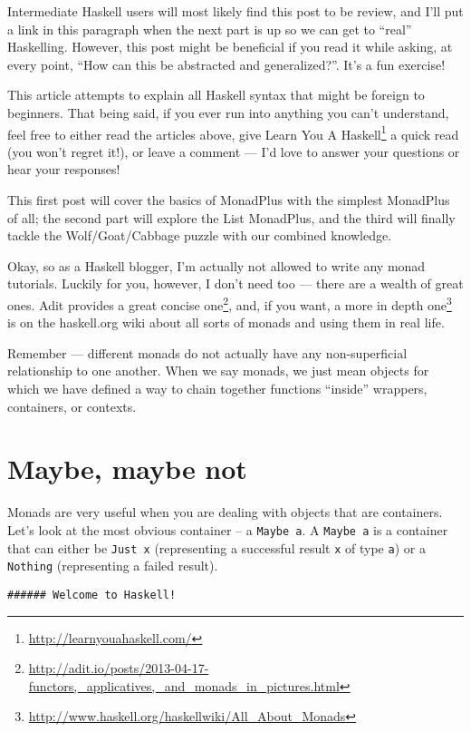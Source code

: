 \documentclass[]{article}
\renewcommand{\href}[2]{#2\footnote{\url{#1}}}
\begin{document}
Intermediate Haskell users will most likely find this post to be review,
and I'll put a link in this paragraph when the next part is up so we can
get to ``real'' Haskelling. However, this post might be beneficial if
you read it while asking, at every point, ``How can this be abstracted
and generalized?''. It's a fun exercise!

This article attempts to explain all Haskell syntax that might be
foreign to beginners. That being said, if you ever run into anything you
can't understand, feel free to either read the articles above, give
\href{http://learnyouahaskell.com/}{Learn You A Haskell} a quick read
(you won't regret it!), or leave a comment --- I'd love to answer your
questions or hear your responses!

This first post will cover the basics of MonadPlus with the simplest
MonadPlus of all; the second part will explore the List MonadPlus, and
the third will finally tackle the Wolf/Goat/Cabbage puzzle with our
combined knowledge.

Okay, so as a Haskell blogger, I'm actually not allowed to write any
monad tutorials. Luckily for you, however, I don't need too --- there
are a wealth of great ones.
\href{http://adit.io/posts/2013-04-17-functors,_applicatives,_and_monads_in_pictures.html}{Adit
provides a great concise one}, and, if you want,
\href{http://www.haskell.org/haskellwiki/All_About_Monads}{a more in
depth one} is on the haskell.org wiki about all sorts of monads and
using them in real life.

Remember --- different monads do not actually have any non-superficial
relationship to one another. When we say monads, we just mean objects
for which we have defined a way to chain together functions ``inside''
wrappers, containers, or contexts.

\section{Maybe, maybe not}\label{maybe-maybe-not}

Monads are very useful when you are dealing with objects that are
containers. Let's look at the most obvious container -- a
\texttt{Maybe\ a}. A \texttt{Maybe\ a} is a container that can either be
\texttt{Just\ x} (representing a successful result \texttt{x} of type
\texttt{a}) or a \texttt{Nothing} (representing a failed result).

\begin{verbatim}
###### Welcome to Haskell!
\end{verbatim}
\end{document}
